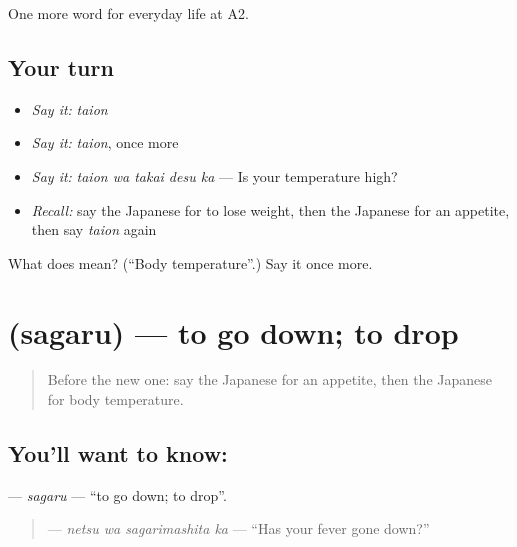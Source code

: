 \begin{grammarlens}[title={What you've built}]
One more word for everyday life at A2.
\end{grammarlens}

\subsection*{Your turn}
\begin{itemize}
\raggedright
  \item \emph{Say it:} \emph{taion}
  \item \emph{Say it:} \emph{taion}, once more
  \item \emph{Say it:} \emph{taion wa takai desu ka} — Is your temperature high?
  \item \emph{Recall:} say the Japanese for to lose weight, then the Japanese for an appetite, then say \emph{taion} again
\end{itemize}

\begin{tcolorbox}[breakable,colback=teal!4,colframe=teal!35!black,title={Before you move on}]
What does  mean? (\textquotedblleft{}Body temperature\textquotedblright{}.) Say it once more.
\end{tcolorbox}
\section[\texorpdfstring{\ja{さがる} (sagaru)}{さがる (sagaru)}]{ (sagaru) — to go down; to drop}

\label{lesson:JA-C221-sagaru}



\begin{quote}
Before the new one: say the Japanese for an appetite, then the Japanese for body temperature.
\end{quote}

\subsection*{You'll want to know: }
\textbf{} — \emph{sagaru} — \textquotedblleft{}to go down; to drop\textquotedblright{}.

\begin{quote}
\textbf{ } — \emph{netsu wa sagarimashita ka} — \textquotedblleft{}Has your fever gone down?\textquotedblright{}
\end{quote}

